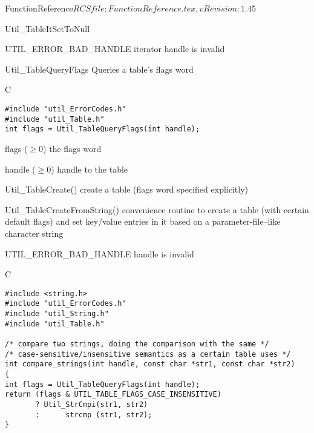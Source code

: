 \begin{cactuspart}{5}{FunctionReference}{$RCSfile: FunctionReference.tex,v $}{$Revision: 1.45 $}
\begin{FunctionDescription}{Util\_TableItSetToNull}
\begin{Error}{UTIL\_ERROR\_BAD\_HANDLE}
iterator handle is invalid
\end{Error}
\end{FunctionDescription}


\begin{FunctionDescription}{Util\_TableQueryFlags}
Queries a table's flags word
\label{Util-TableQueryFlags}

\begin{Synopsis}{C}
\begin{verbatim}
#include "util_ErrorCodes.h"
#include "util_Table.h"
int flags = Util_TableQueryFlags(int handle);
\end{verbatim}
\end{Synopsis}

\begin{Result}{flags ($\ge 0$)}
the flags word
\end{Result}

\begin{Parameter}{handle ($\ge 0$)}
handle to the table
\end{Parameter}

\begin{Discussion}
\end{Discussion}

\begin{SeeAlso}{Util\_TableCreate()}
create a table (flags word specified explicitly)
\end{SeeAlso}
\begin{SeeAlso}{Util\_TableCreateFromString()}
convenience routine to create a table (with certain default flags)
and set key/value entries in it based on a parameter-file--like
character string
\end{SeeAlso}

\begin{Error}{UTIL\_ERROR\_BAD\_HANDLE}
handle is invalid
\end{Error}

\begin{Example}{C}
\begin{verbatim}
#include <string.h>
#include "util_ErrorCodes.h"
#include "util_String.h"
#include "util_Table.h"

/* compare two strings, doing the comparison with the same */
/* case-sensitive/insensitive semantics as a certain table uses */
int compare_strings(int handle, const char *str1, const char *str2)
{
int flags = Util_TableQueryFlags(int handle);
return (flags & UTIL_TABLE_FLAGS_CASE_INSENSITIVE)
       ? Util_StrCmpi(str1, str2)
       :      strcmp (str1, str2);
}
\end{verbatim}
\end{Example}
\end{FunctionDescription}


\end{cactuspart}
